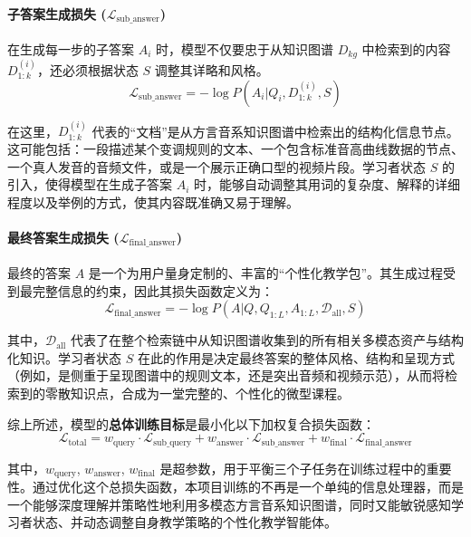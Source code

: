 \paragraph{子答案生成损失 ($\mathcal{L}_{\text{sub\_answer}}$)}
在生成每一步的子答案 $A_i$ 时，模型不仅要忠于从知识图谱 $D_{kg}$ 中检索到的内容 $D^{(i)}_{1:k}$，还必须根据状态 $S$ 调整其详略和风格。
\begin{equation}
\mathcal{L}_{\text{sub\_answer}} = - \log P(A_i | Q_i, D^{(i)}_{1:k}, S)
\end{equation}

在这里，$D^{(i)}_{1:k}$ 代表的“文档”是从方言音系知识图谱中检索出的结构化信息节点。这可能包括：一段描述某个变调规则的文本、一个包含标准音高曲线数据的节点、一个真人发音的音频文件，或是一个展示正确口型的视频片段。学习者状态 $S$ 的引入，使得模型在生成子答案 $A_i$ 时，能够自动调整其用词的复杂度、解释的详细程度以及举例的方式，使其内容既准确又易于理解。

\paragraph{最终答案生成损失 ($\mathcal{L}_{\text{final\_answer}}$)}
最终的答案 $A$ 是一个为用户量身定制的、丰富的“个性化教学包”。其生成过程受到最完整信息的约束，因此其损失函数定义为：
\begin{equation}
\mathcal{L}_{\text{final\_answer}} = - \log P(A | Q, Q_{1:L}, A_{1:L}, \mathcal{D}_{\text{all}}, S)
\end{equation}

其中，$\mathcal{D}_{\text{all}}$ 代表了在整个检索链中从知识图谱收集到的所有相关多模态资产与结构化知识。学习者状态 $S$ 在此的作用是决定最终答案的整体风格、结构和呈现方式（例如，是侧重于呈现图谱中的规则文本，还是突出音频和视频示范），从而将检索到的零散知识点，合成为一堂完整的、个性化的微型课程。

综上所述，模型的\textbf{总体训练目标}是最小化以下加权复合损失函数：
\begin{equation}
\mathcal{L}_{\text{total}} = w_{\text{query}} \cdot \mathcal{L}_{\text{sub\_query}} + w_{\text{answer}} \cdot \mathcal{L}_{\text{sub\_answer}} + w_{\text{final}} \cdot \mathcal{L}_{\text{final\_answer}}
\end{equation}

其中，$w_{\text{query}}$, $w_{\text{answer}}$, $w_{\text{final}}$ 是超参数，用于平衡三个子任务在训练过程中的重要性。通过优化这个总损失函数，本项目训练的不再是一个单纯的信息处理器，而是一个能够深度理解并策略性地利用多模态方言音系知识图谱，同时又能敏锐感知学习者状态、并动态调整自身教学策略的个性化教学智能体。

